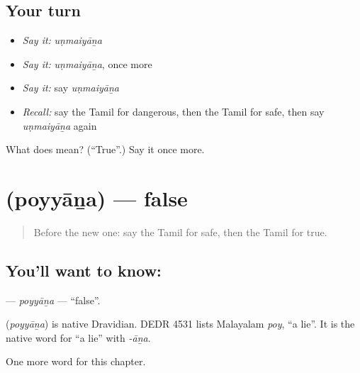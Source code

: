 \subsection*{Your turn}
\begin{itemize}
\raggedright
  \item \emph{Say it:} \emph{uṇmaiyāṉa}
  \item \emph{Say it:} \emph{uṇmaiyāṉa}, once more
  \item \emph{Say it:} say \emph{uṇmaiyāṉa}
  \item \emph{Recall:} say the Tamil for dangerous, then the Tamil for safe, then say \emph{uṇmaiyāṉa} again
\end{itemize}

\begin{tcolorbox}[breakable,colback=teal!4,colframe=teal!35!black,title={Before you move on}]
What does  mean? (\textquotedblleft{}True\textquotedblright{}.) Say it once more.
\end{tcolorbox}
\section[\texorpdfstring{\ta{பொய்யான} (poyyāṉa)}{பொய்யான (poyyāṉa)}]{ (poyyāṉa) — false}

\label{lesson:TA-C149-poyyana}



\begin{quote}
Before the new one: say the Tamil for safe, then the Tamil for true.
\end{quote}

\subsection*{You'll want to know: }
\textbf{} — \emph{poyyāṉa} — \textquotedblleft{}false\textquotedblright{}.

\begin{cousinweb}
\textbf{} (\emph{poyyāṉa}) is native Dravidian. DEDR 4531 lists Malayalam \emph{poy}, \textquotedblleft{}a lie\textquotedblright{}. It is the native word for \textquotedblleft{}a lie\textquotedblright{} with \emph{-āṉa}.
\end{cousinweb}

\begin{grammarlens}[title={What you've built}]
One more word for this chapter.
\end{grammarlens}

